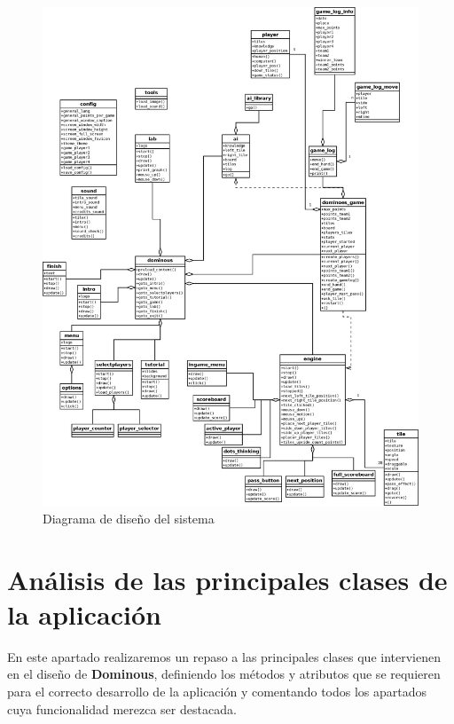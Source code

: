 \begin{figure}[H]
  \label{fig:diagrama_clases_diseno}
  \begin{center}
    \includegraphics[width=1\textwidth]{diagrama_clases_diseno.png}
  \end{center}
  \caption{Diagrama de diseño del sistema}
\end{figure}


\section{Análisis de las principales clases de la aplicación}

En este apartado realizaremos un repaso a las principales clases que intervienen en el diseño de \textbf{Dominous},
definiendo los métodos y atributos que se requieren para el correcto desarrollo de la aplicación y comentando
todos los apartados cuya funcionalidad merezca ser destacada.

